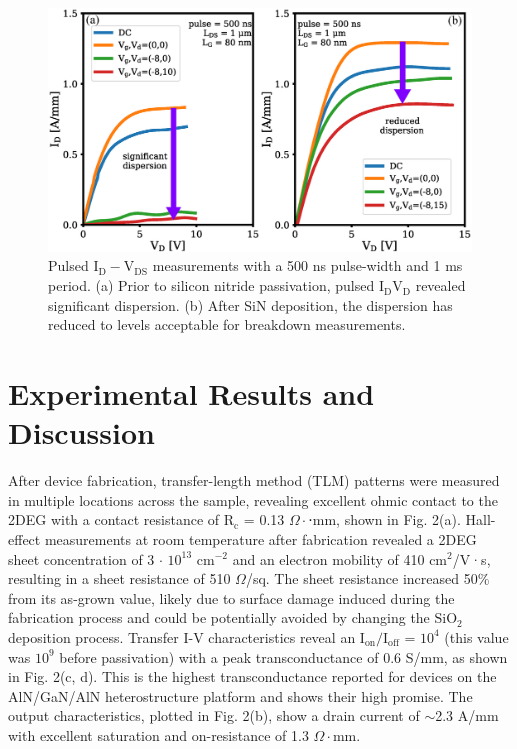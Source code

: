 \documentclass[journal]{IEEEtran}
\begin{document}
\begin{figure}[!b]
\centering
\includegraphics[width=\columnwidth]{Figure3_15V.eps}
\caption{Pulsed $\mathrm{I_D-V_{DS}}$ measurements with a 500 ns pulse-width and 1 ms period. (a) Prior to silicon nitride passivation, pulsed $\mathrm{I_DV_D}$ revealed significant dispersion. (b) After SiN deposition, the dispersion has reduced to levels acceptable for breakdown measurements. }
\label{fig:pulsed}
\end{figure}

\section{Experimental Results and Discussion}
\label{sec:Experimental Results and Discussion}
After device fabrication, transfer-length method (TLM) patterns were measured in multiple locations across the sample, revealing excellent ohmic contact to the 2DEG with a contact resistance of $\mathrm{R_c}$ = 0.13 $\Omega\cdot$⋅mm, shown in Fig. 2(a). Hall-effect measurements at room temperature after fabrication revealed a 2DEG sheet concentration of 3 $\cdot$ $\mathrm{10^{13}}$ $\mathrm{cm^{-2}}$ and an electron mobility of 410 $\mathrm{cm^2}$/V·s, resulting in a sheet resistance of 510 $\Omega$/sq. The sheet resistance increased 50\% from its as-grown value, likely due to surface damage induced during the fabrication process and could be potentially avoided by changing the $\mathrm{SiO_2}$ deposition process. Transfer I-V characteristics reveal an $\mathrm{I_{on}}/\mathrm{I_{off}}$ = $\mathrm{10^4}$ (this value was $\mathrm{10^9}$ before passivation) with a peak transconductance of 0.6 S/mm, as shown in Fig. 2(c, d). This is the highest transconductance reported for devices on the AlN/GaN/AlN heterostructure platform and shows their high promise. The output characteristics, plotted in Fig. 2(b), show a drain current of $\sim$2.3 A/mm with excellent saturation and on-resistance of 1.3 $\Omega\cdot$mm.
\end{document}
